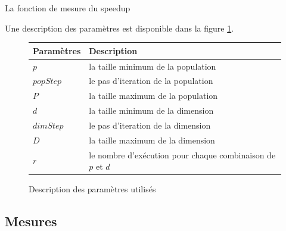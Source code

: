 \incmargin{1em}
\begin{algorithm}[here]
  \dontprintsemicolon
  \caption{La fonction de mesure du speedup}
  \label{algo_speedup}
\end{algorithm}
\decmargin{1em}

Une description des paramètres est disponible dans la figure \ref{fig:description_parametres}.

\begin{figure}[here]
  \centering
  \begin{tabular}{ | l | p{7cm} |}
    \hline
    \textbf{Paramètres} & \textbf{Description}\\\hline
    $p$ & la taille minimum de la population\\\hline
    $popStep$ & le pas d'iteration de la population\\\hline
    $P$ & la taille maximum de la population\\\hline
    $d$ & la taille minimum de la dimension\\\hline
    $dimStep$ & le pas d'iteration de la dimension\\\hline
    $D$ & la taille maximum de la dimension\\\hline
    $r$ & le nombre d'exécution pour chaque combinaison de $p$ et $d$\\\hline
  \end{tabular}
  \caption{Description des paramètres utilisés}
  \label{fig:description_parametres}
\end{figure}

\subsection{Mesures}

